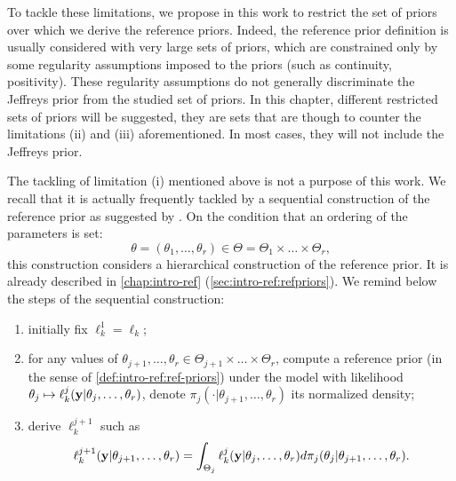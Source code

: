 To tackle these limitations, we propose in this work to restrict the set of priors over which we derive the reference priors.
Indeed, the reference prior definition is usually considered with very large sets of priors, which are constrained only by some regularity assumptions imposed to the priors (such as continuity, positivity). These regularity assumptions do not generally discriminate the Jeffreys prior from the studied set of priors.
In this chapter, different restricted sets of priors will be suggested, they are sets that are though 
to counter the limitations (ii) and (iii) aforementioned. In most cases, they will not include the Jeffreys prior.



The tackling of limitation (i) mentioned above is not a purpose of this work. We recall that it is actually frequently tackled by a sequential construction of the reference prior as %
suggested by \citet{bernardo_reference_1979}.
On the condition that an ordering of the parameters is set:
 \begin{equation}
     \theta = (\theta_1,\dots,\theta_r) \in \Theta=\Theta_1\times\dots\times\Theta_r,
 \end{equation}
this construction considers a hierarchical construction of the reference prior.
It is already described in \cref{chap:intro-ref} (\cref{sec:intro-ref:refpriors}). We remind below the steps of the sequential construction:
%
 \begin{enumerate}
     \item initially fix $\ell_k^1=\ell_k$;
     \item for any values of $\theta_{j+1},\dots,\theta_r\in\Theta_{j+1}\times\dots\times\Theta_r$, compute a reference prior (in the sense of \cref{def:intro-ref:ref-priors})  under the model with likelihood $\theta_j\mapsto\ell_k^j(\mathbf{y}|\theta_j,\dots,\theta_r)$, denote $\pi_j(\cdot|\theta_{j+1},\dots,\theta_r)$ its normalized density;
     \item derive $\ell_k^{j+1}$ such as 
         \begin{equation} %
            \ell_k^{j+1}(\mbf y|\theta_{j+1},\dots,\theta_r) =  \int_{\Theta_j}\ell_k^j(\mbf y|\theta_j,\dots,\theta_r)d\pi_j(\theta_j|\theta_{j+1},\dots,\theta_r).
         \end{equation}
 \end{enumerate}


